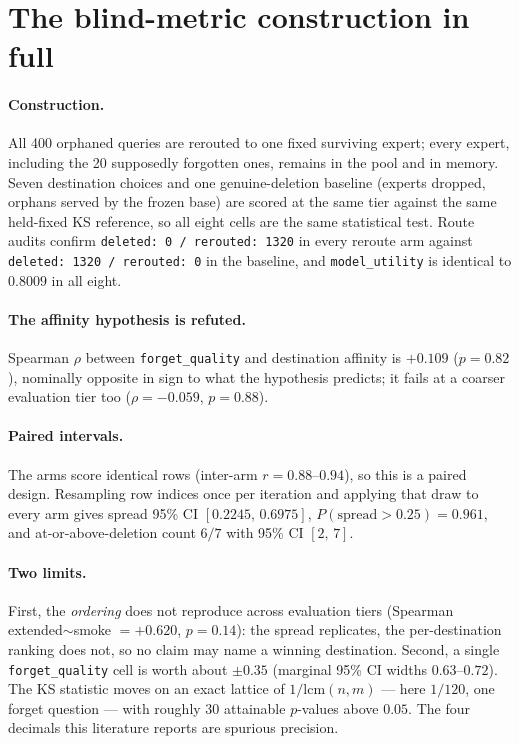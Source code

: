 \documentclass{article}
\newcommand{\fq}{\texttt{forget\_quality}}
\newcommand{\util}{\texttt{model\_utility}}
\begin{document}
\section{The blind-metric construction in full}
\label{app:e5}

\paragraph{Construction.} All 400 orphaned queries are rerouted to one fixed surviving expert;
every expert, including the 20 supposedly forgotten ones, remains in the pool and in memory. Seven
destination choices and one genuine-deletion baseline (experts dropped, orphans served by the
frozen base) are scored at the same tier against the same held-fixed KS reference, so all eight
cells are the same statistical test. Route audits confirm \texttt{deleted:\,0 / rerouted:\,1320} in
every reroute arm against \texttt{deleted:\,1320 / rerouted:\,0} in the baseline, and \util{} is
identical to $0.8009$ in all eight.

\paragraph{The affinity hypothesis is refuted.} Spearman $\rho$ between \fq{} and destination
affinity is $+0.109$ ($p=0.82$), nominally opposite in sign to what the hypothesis predicts; it
fails at a coarser evaluation tier too ($\rho=-0.059$, $p=0.88$).

\paragraph{Paired intervals.} The arms score identical rows (inter-arm $r=0.88$--$0.94$), so this
is a paired design. Resampling row indices once per iteration and applying that draw to every arm
gives spread 95\% CI $[0.2245,\,0.6975]$, $P(\text{spread}>0.25)=0.961$, and at-or-above-deletion
count $6/7$ with 95\% CI $[2,\,7]$.

\paragraph{Two limits.} First, the \emph{ordering} does not reproduce across evaluation tiers
(Spearman extended$\sim$smoke $=+0.620$, $p=0.14$): the spread replicates, the per-destination
ranking does not, so no claim may name a winning destination. Second, a single \fq{} cell is worth
about $\pm 0.35$ (marginal 95\% CI widths $0.63$--$0.72$). The KS statistic moves on an exact
lattice of $1/\mathrm{lcm}(n,m)$ --- here $1/120$, one forget question --- with roughly 30
attainable $p$-values above $0.05$. The four decimals this literature reports are spurious
precision.
\end{document}
